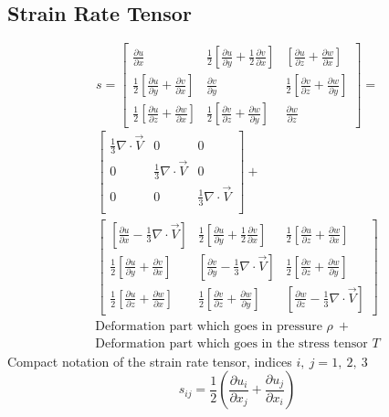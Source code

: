 \documentclass[class=report, crop=false, 12pt,a4paper]{standalone}
\begin{document}
\subsection{Strain Rate Tensor}
\begin{equation}
  s = \begin{bmatrix}
    \frac{\partial u}{\partial x} & \frac{1}{2} \left[ \frac{\partial u}{\partial y} + \frac{1}{2} \frac{\partial v}{\partial x} \right] & \left[ \frac{\partial u}{\partial z} + \frac{\partial w}{\partial x} \right]\\
    \frac{1}{2} \left[ \frac{\partial u}{\partial y} + \frac{\partial v}{\partial x} \right] & \frac{\partial v}{\partial y} & \frac{1}{2} \left[ \frac{\partial v}{\partial z} + \frac{\partial w}{\partial y} \right] \\
    \frac{1}{2} \left[ \frac{\partial u}{\partial z} + \frac{\partial w}{\partial x} \right] & \frac{1}{2} \left[ \frac{\partial v}{\partial z} + \frac{\partial w}{\partial y} \right] & \frac{\partial w}{\partial z}
  \end{bmatrix} =
\end{equation}
\begin{multline}
  \begin{bmatrix}
    \frac{1}{3} \nabla \cdot \vec{V} & 0 & 0\\
    0 & \frac{1}{3} \nabla \cdot \vec{V} & 0\\
    0 & 0 & \frac{1}{3} \nabla \cdot \vec{V}\\ 
  \end{bmatrix} + \\
  \begin{bmatrix}
    \left[\frac{\partial u}{\partial x} - \frac{1}{3} \nabla \cdot \vec{V} \right] & \frac{1}{2} \left[ \frac{\partial u}{\partial y} + \frac{1}{2} \frac{\partial v}{\partial x} \right] & \frac{1}{2} \left[ \frac{\partial u}{\partial z} + \frac{\partial w}{\partial x} \right]\\
    \frac{1}{2} \left[ \frac{\partial u}{\partial y} + \frac{\partial v}{\partial x} \right] & \left[ \frac{\partial v}{\partial y} - \frac{1}{3} \nabla \cdot \vec{V} \right] & \frac{1}{2} \left[ \frac{\partial v}{\partial z} + \frac{\partial w}{\partial y} \right] \\
    \frac{1}{2} \left[ \frac{\partial u}{\partial z} + \frac{\partial w}{\partial x} \right] & \frac{1}{2} \left[ \frac{\partial v}{\partial z} + \frac{\partial w}{\partial y} \right] & \left[ \frac{\partial w}{\partial z} - \frac{1}{3} \nabla \cdot \vec{V} \right]
  \end{bmatrix}
\end{multline}
\begin{multline}
  \textrm{Deformation part which goes in pressure } \rho \ +\\ \textrm{Deformation part which goes in the stress tensor } T
\end{multline}
Compact notation of the strain rate tensor, indices $i, \ j = 1, \ 2,\ 3$
\begin{equation}
  s_{ij} = \frac{1}{2} \left( \frac{\partial u_i}{\partial x_j} + \frac{\partial u_j}{\partial x_i} \right)
\end{equation}
\end{document}
